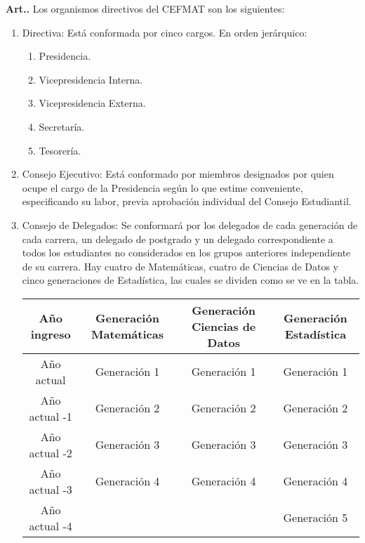 \documentclass[letterpaper,11pt]{article}
\newcounter{art}
\newenvironment{art}{\refstepcounter{art}\mbox{\textbf{Art.{\space}\theart.}}\ignorespaces}{}
\begin{document}
\begin{art}\label{organismosDirectivos}
    Los organismos directivos del CEFMAT son los siguientes:
    \begin{enumerate}
        \item Directiva: Está conformada por cinco cargos. En orden jerárquico:
              \begin{enumerate}
                  \item Presidencia.
                  \item Vicepresidencia Interna.
                  \item Vicepresidencia Externa.
                  \item Secretaría.
                  \item Tesorería.
              \end{enumerate}
        \item Consejo Ejecutivo: Está conformado por miembros designados por quien ocupe el cargo de la Presidencia según lo que estime conveniente, especificando su labor, previa aprobación individual del Consejo Estudiantil.
        \item Consejo de Delegados: Se conformará por los delegados de cada generación de cada carrera, un delegado de postgrado y un delegado correspondiente a todos los estudiantes no considerados en los grupos anteriores independiente de su carrera. Hay cuatro de Matemáticas, cuatro de Ciencias de Datos y cinco generaciones de Estadística, las cuales se dividen como se ve en la tabla.
              \begin{figure*}[h]
                  \begin{tabular}{|c|c|c|c|}
                      \hline
                      Año ingreso   & Generación Matemáticas & Generación Ciencias de Datos & Generación Estadística \\
                      \hline
                      Año actual    & Generación 1           & Generación 1                 & Generación 1           \\
                      Año actual -1 & Generación 2           & Generación 2                 & Generación 2           \\
                      Año actual -2 & Generación 3           & Generación 3                 & Generación 3           \\
                      Año actual -3 & Generación 4           & Generación 4                 & Generación 4           \\
                      Año actual -4 &                        &                              & Generación 5           \\

\end{tabular}
\end{figure*}
\end{enumerate}
\end{art}
\end{document}
